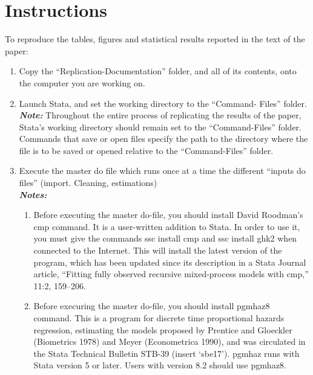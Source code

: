 \documentclass[12pt,a4paper]{article}
\begin{document}
\section{Instructions}

To reproduce the tables, figures and statistical results reported in the text of the paper:

\begin{enumerate}
	\item Copy the “Replication-Documentation” folder, and all of its contents, onto the computer you are working on.
	
	\item Launch Stata, and set the working directory to the “Command- Files” folder. \\ 
	
	\textbf{\textit{Note:}}  Throughout the entire process of replicating the results of the paper, Stata’s working directory should remain set to the “Command-Files” folder.  Commands that save or open files specify the path to the directory where the file is to be saved or opened relative to the “Command-Files” folder.
	
	\item Execute the master do file which runs once at a time the different “inputs do files” (import. Cleaning, estimations)\\
	
\textbf{\textit{Notes:}} 
\begin{enumerate}
	\item Before executing the master do-file, you should install David Roodman’s cmp command. It is a user-written addition to Stata. In order to use it, you must give the commands ssc install cmp and ssc install ghk2 when connected to the Internet. This will install the latest version of the program, which has been updated since its description in a Stata Journal article, “Fitting fully observed recursive mixed-process models with cmp,” 11:2, 159–206.
	\item Before execuring the master do-file, you should install pgmhaz8 command. This is a program for discrete time proportional hazards regression, estimating the models proposed by Prentice and Gloeckler (Biometrics 1978) and Meyer (Econometrica 1990), and was circulated in the Stata Technical Bulletin STB-39 (insert ‘sbe17’). pgmhaz runs with Stata version 5 or later. Users with version 8.2 should use pgmhaz8.
\end{enumerate}

	
\end{enumerate}
\end{document}
